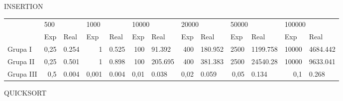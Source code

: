 \documentclass{article}
\begin{document}
INSERTION

\begin{table}[H]
    \begin{tabular}{lrlrlrlrlrlrl}
                       & \multicolumn{2}{l}{500}         & \multicolumn{2}{l}{1000}        & \multicolumn{2}{l}{10000}              & \multicolumn{2}{l}{20000}         & \multicolumn{2}{l}{50000}          & \multicolumn{2}{l}{100000}         \\
    \multirow{-2}{*}{} & \multicolumn{1}{l}{Exp} & Real  & \multicolumn{1}{l}{Exp} & Real  & \multicolumn{1}{l}{Exp}      & Real    & \multicolumn{1}{l}{Exp} & Real    & \multicolumn{1}{l}{Exp} & Real     & \multicolumn{1}{l}{Exp} & Real     \\
    Grupa I            & 0,25                    & 0.254 & 1                       & 0.525 & 100  & 91.392  & 400                     & 180.952 & 2500                    & 1199.758 & 10000                   & 4684.442 \\
    Grupa II           & 0,25                    & 0.501 & 1                       & 0.898 & 100  & 205.695 & 400                     & 381.383 & 2500                    & 24540.28 & 10000                   & 9633.041 \\
    Grupa III          & 0,5                     & 0.004 & 0,001                   & 0.004 & 0,01 & 0.038   & 0,02                    & 0.059   & 0,05                    & 0.134    & 0,1                     & 0.268   
    \end{tabular}
    \end{table}

QUICKSORT
\end{document}
